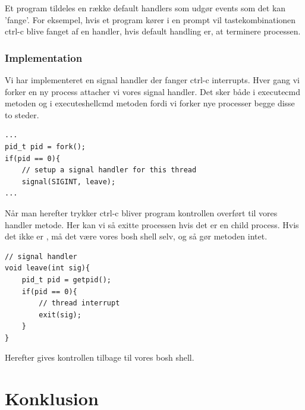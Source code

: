 \documentclass[danish]{report}
\begin{document}
Et program tildeles en række default handlers som udgør events som det kan 'fange'. For eksempel, hvis et program kører i en prompt vil tastekombinationen ctrl-c blive fanget af en handler, hvis default handling er, at terminere processen. 

\subsection{Implementation}
Vi har implementeret en signal handler der fanger ctrl-c interrupts. Hver gang vi forker en ny process attacher vi vores signal handler. Det sker både i executecmd metoden og i executeshellcmd metoden fordi vi forker nye processer begge disse to steder. 

\begin{lstlisting}
...
pid_t pid = fork();
if(pid == 0){
	// setup a signal handler for this thread
	signal(SIGINT, leave);
...
\end{lstlisting}

Når man herefter trykker ctrl-c bliver program kontrollen overført til vores handler metode. Her kan vi så exitte processen hvis det er en child process. Hvis det ikke er , må det være vores bosh shell selv, og så gør metoden intet. 

\begin{lstlisting}
// signal handler
void leave(int sig){
	pid_t pid = getpid();
	if(pid == 0){
		// thread interrupt
		exit(sig);
	}
}
\end{lstlisting}

Herefter gives kontrollen tilbage til vores bosh shell.

\chapter{Konklusion}
\end{document}
